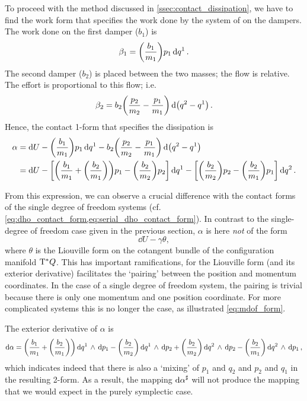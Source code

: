 To proceed with the method discussed in \cref{ssec:contact_dissipation}, we have to find the work form that specifies the work done by the system of on the dampers. The work done on the first damper (\(b_1\)) is
\begin{equation}
     \beta_1 = \qty(\frac{b_1}{m_1})p_1\dd{q^1}.
\end{equation}
The second damper (\(b_2\)) is placed between the two masses; the flow is relative. The effort is proportional to this flow; i.e.
\begin{equation}
     \beta_2 = b_2\qty(\frac{p_2}{m_2} - \frac{p_1}{m_1})\dd{\qty(q^2 - q^1)}.
\end{equation}
Hence, the contact 1-form that specifies the dissipation is
\begin{equation}
    \begin{split}
        \alpha  &= \dd{U} - \qty(\frac{b_1}{m_1})p_1\dd{q^1} - b_2\qty(\frac{p_2}{m_2} - \frac{p_1}{m_1})\dd{\qty(q^2 - q^1)} \\
                &= \dd{U} - \qty[\qty(\frac{b_1}{m_1} + \qty(\frac{b_2}{m_1})) p_1 - \qty(\frac{b_2}{m_2})p_2]\dd{q^1}
                          - \qty[\qty(\frac{b_2}{m_2})p_2 - \qty(\frac{b_2}{m_1})p_1]\dd{q^2}.
    \end{split}
    \label{eq:mdof_form}
\end{equation}

From this expression, we can observe a crucial difference with the contact forms of the single degree of freedom systems (cf. \cref{eq:dho_contact_form,eq:serial_dho_contact_form}). In contrast to the single-degree of freedom case given in the previous section, \(\alpha\) is here \emph{not} of the form
\begin{equation}
     \dd{U} - \gamma \theta,
\end{equation}
where \(\theta\) is the Liouville form on the cotangent bundle of the configuration manifold \(\mathrm{T}^*Q\). This has important ramifications, for the Liouville form (and its exterior derivative) facilitates the `pairing' between the position and momentum coordinates. In the case of a single degree of freedom system, the pairing is trivial because there is only one momentum and one position coordinate. For more complicated systems this is no longer the case, as illustrated \cref{eq:mdof_form}.

The exterior derivative of \(\alpha\) is
\begin{equation}
     \dd{\alpha} = \qty(\frac{b_1}{m_1} + \qty(\frac{b_2}{m_1}))  \dd{q^1}\,\wedge\,\dd{p_1} 
                  -\qty(\frac{b_2}{m_2}) \dd{q^1}\,\wedge\,\dd{p_2} 
                  + \qty(\frac{b_2}{m_2}) \dd{q^2}\,\wedge\,\dd{p_2} 
                  - \qty(\frac{b_2}{m_1}) \dd{q^2}\,\wedge\,\dd{p_1} ,
\end{equation}
which indicates indeed that there is also a `mixing' of \(p_1\) and \(q_2\) and \(p_2\) and \(q_1\) in the resulting 2-form. As a result, the mapping \( \dd{\alpha}^\sharp \) will not produce the mapping that we would expect in the purely symplectic case.

